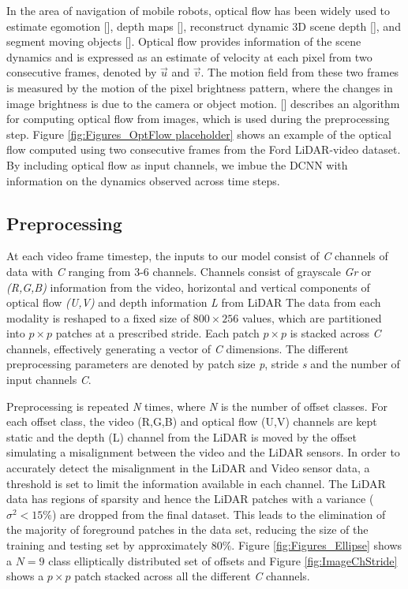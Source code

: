 \documentclass{article}
\begin{document}
In the area of navigation of mobile robots, optical flow has been widely used to estimate egomotion [\cite{Prazdny1980-egomotion-OF}], depth maps [\cite{Shahraray1988-depthestimation-OF}], reconstruct dynamic 3D scene depth [\cite{Yang2012-reconstruction-OF}], and segment moving objects [\cite{Shao2002-seg-OF}]. Optical flow provides information of the scene dynamics and is expressed as an estimate of velocity at each pixel from two consecutive frames, denoted by $\vec{u}$ and $\vec{v}$. The motion field from these two frames is measured by the motion of the pixel brightness pattern, where the changes in image brightness is due to the camera or object motion. [\cite{Liu2009Beyond-Pix}] describes an algorithm for computing optical flow from images, which is used during the preprocessing step. Figure \ref{fig:Figures_OptFlow placeholder} shows an example of the optical flow computed using two consecutive frames from the Ford LiDAR-video dataset. By including optical flow as input channels, we imbue the DCNN with information on the dynamics observed across time steps.


\subsection{Preprocessing} %
\label{sub:preprocessing}
At each video frame timestep, the inputs to our model consist of \emph{C} channels of data with \emph{C} ranging from 3-6 channels. Channels consist of grayscale \emph{Gr} or \emph{(R,G,B)} information from the video, horizontal and vertical components of optical flow \emph{(U,V)} and depth information \emph{L} from LiDAR The data from each modality is reshaped to a fixed size of $800\times256$ values, which are partitioned into $p\times p$ patches at a prescribed stride. Each patch $p\times p$ is stacked across \emph{C} channels, effectively generating a vector of \emph{C} dimensions. The different preprocessing parameters are denoted by patch size \emph{p}, stride \emph{s} and the number of input channels \emph{C}.

Preprocessing is repeated \emph{N} times, where \emph{N} is the number of offset classes. For each offset class, the video (R,G,B) and optical flow (U,V) channels are kept static and the depth (L) channel from the LiDAR is moved by the offset simulating a misalignment between the video and the LiDAR sensors. In order to accurately detect the misalignment in the LiDAR and Video sensor data, a threshold is set to limit the information available in each channel. The LiDAR data has regions of sparsity and hence the LiDAR patches with a variance (${\sigma}^2 < 15\%$) are dropped from the final dataset. This leads to the elimination of the majority of foreground patches in the data set, reducing the size of the training and testing set by approximately $80\%$. Figure \ref{fig:Figures_Ellipse} shows a $N = 9$ class elliptically distributed set of offsets and Figure \ref{fig:ImageChStride} shows a $p\times p$ patch stacked across all the different \emph{C} channels.
\end{document}
